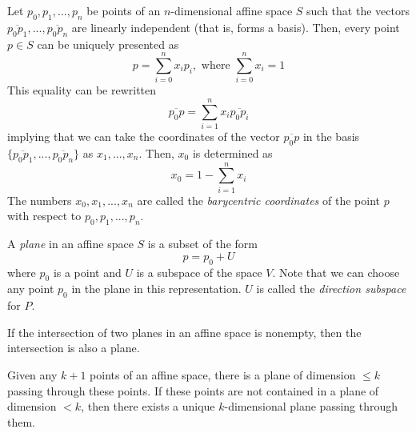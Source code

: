 \documentclass{article}
\begin{document}
    \begin{definition}
      Let $p_0, p_1, ..., p_n$ be points of an $n$-dimensional affine space $S$ such that the vectors $\overline{p_0 p_1}, ..., \overline{p_0 p_n}$ are linearly independent (that is, forms a basis). Then, every point $p \in S$ can be uniquely presented as 
      \begin{equation}
        p = \sum_{i=0}^n x_i p_i, \text{ where } \sum_{i=0}^n x_i = 1
      \end{equation}
      This equality can be rewritten
      \begin{equation}
        \overline{p_0 p} = \sum_{i=1}^n x_i \overline{p_0 p_i}
      \end{equation}
      implying that we can take the coordinates of the vector $\overline{p_0 p}$ in the basis $\{ \overline{p_0 p_1}, ..., \overline{p_0 p_n}\}$ as $x_1, ..., x_n$. Then, $x_0$ is determined as 
      \begin{equation}
        x_0 = 1 - \sum_{i=1}^n x_i
      \end{equation}
      The numbers $x_0, x_1, ..., x_n$ are called the \textit{barycentric coordinates} of the point $p$ with respect to $p_0, p_1, ..., p_n$. 
    \end{definition}

    \begin{definition}
      A \textit{plane} in an affine space $S$ is a subset of the form 
      \begin{equation}
        p = p_0 + U
      \end{equation}
      where $p_0$ is a point and $U$ is a subspace of the space $V$. Note that we can choose any point $p_0$ in the plane in this representation. $U$ is called the \textit{direction subspace} for $P$. 
    \end{definition}

    \begin{lemma}
      If the intersection of two planes in an affine space is nonempty, then the intersection is also a plane. 
    \end{lemma}

    \begin{theorem}
      Given any $k+1$ points of an affine space, there is a plane of dimension $\leq k$ passing through these points. If these points are not contained in a plane of dimension $< k$, then there exists a unique $k$-dimensional plane passing through them. 
    \end{theorem}
\end{document}
